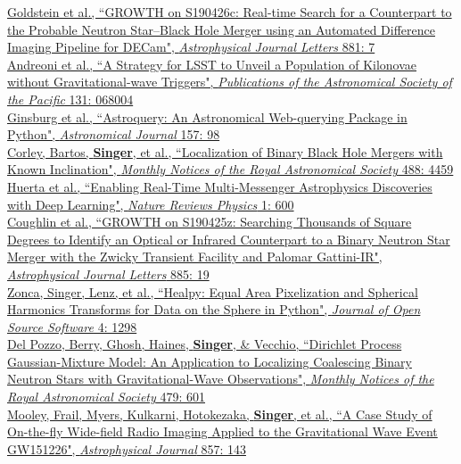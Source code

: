 \documentclass[10pt, letterpaper]{article} %
\newcommand{\years}[1]{\marginnote{\scriptsize #1}} %
\begin{document}
%
\years{2019}\href{https://doi.org/10.3847/2041-8213/ab3046}{Goldstein et al., “GROWTH on S190426c: Real-time Search for a Counterpart to the Probable Neutron Star–Black Hole Merger using an Automated Difference Imaging Pipeline for DECam", \emph{Astrophysical Journal Letters} 881: 7}\\[0.125cm]
%
\years{2019}\href{https://doi.org/10.1088/1538-3873/ab1531}{Andreoni et al., “A Strategy for LSST to Unveil a Population of Kilonovae without Gravitational-wave Triggers", \emph{Publications of the Astronomical Society of the Pacific} 131: 068004}\\[0.125cm]
%
\years{2019}\href{https://doi.org/10.3847/1538-3881/aafc33}{Ginsburg et al., “Astroquery: An Astronomical Web-querying Package in Python", \emph{Astronomical Journal} 157: 98}\\[0.125cm]
%
\years{2019}\href{https://doi.org/10.1093/mnras/stz2072}{Corley, Bartos, \textbf{Singer}, et al., “Localization of Binary Black Hole Mergers with Known Inclination", \emph{Monthly Notices of the Royal Astronomical Society} 488: 4459}\\[0.125cm]
%
\years{2019}\href{https://doi.org/10.1038/s42254-019-0097-4}{Huerta et al., “Enabling Real-Time Multi-Messenger Astrophysics Discoveries with Deep Learning", \emph{Nature Reviews Physics} 1: 600}\\[0.125cm]
%
\years{2019}\href{https://doi.org/10.3847/2041-8213/ab4ad8}{Coughlin et al., “GROWTH on S190425z: Searching Thousands of Square Degrees to Identify an Optical or Infrared Counterpart to a Binary Neutron Star Merger with the Zwicky Transient Facility and Palomar Gattini-IR", \emph{Astrophysical Journal Letters} 885: 19}\\[0.125cm]
%
\years{2019}\href{https://doi.org/10.21105/joss.01298}{Zonca, Singer, Lenz, et al., “Healpy: Equal Area Pixelization and Spherical Harmonics Transforms for Data on the Sphere in Python", \emph{Journal of Open Source Software} 4: 1298}\\[0.125cm]
%
\years{2018}\href{https://doi.org/10.1093/mnras/sty1485}{Del Pozzo, Berry, Ghosh, Haines, \textbf{Singer}, \& Vecchio, “Dirichlet Process Gaussian-Mixture Model: An Application to Localizing Coalescing Binary Neutron Stars with Gravitational-Wave Observations", \emph{Monthly Notices of the Royal Astronomical Society} 479: 601}\\[0.125cm]
%
\years{2018}\href{https://doi.org/10.3847/1538-4357/aab7f3}{Mooley, Frail, Myers, Kulkarni, Hotokezaka, \textbf{Singer}, et al., “A Case Study of On-the-fly Wide-field Radio Imaging Applied to the Gravitational Wave Event GW151226", \emph{Astrophysical Journal} 857: 143}\\[0.125cm]
\end{document}

